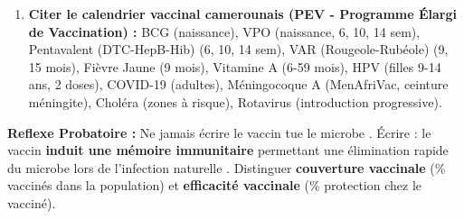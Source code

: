 \documentclass[11pt]{article}
\begin{document}
\begin{methode}
\begin{enumerate}
        \begin{itemize}
            \item \textbf{Seuil de couverture vaccinale ($S_c$) :} $S_c = 1 - \frac{1}{R_0}$ où $R_0$ = nombre de reproduction de base (contagiosité).
            \item Si couverture $> S_c$ : La chaîne de transmission est rompue. Le pathogène ne trouve plus assez d'hôtes sensibles.
            \item \textbf{Protection des non-vaccinables :} Nourrissons trop jeunes, immunodéprimés (VIH, chimiothérapie), allergiques graves, femmes enceintes (pour vaccins vivants atténués).
            \item \textbf{Éradication / Élimination :} Ex: Variole (éradiquée 1980), Polio (éliminée Afrique 2020, endémique seulement Pakistan/Afghanistan), Rougeole (objectif élimination).
        \end{itemize}
        \item \textbf{Citer le calendrier vaccinal camerounais (PEV - Programme Élargi de Vaccination) :} BCG (naissance), VPO (naissance, 6, 10, 14 sem), Pentavalent (DTC-HepB-Hib) (6, 10, 14 sem), VAR (Rougeole-Rubéole) (9, 15 mois), Fièvre Jaune (9 mois), Vitamine A (6-59 mois), HPV (filles 9-14 ans, 2 doses), COVID-19 (adultes), Méningocoque A (MenAfriVac, ceinture méningite), Choléra (zones à risque), Rotavirus (introduction progressive).
    \end{enumerate}
    \textbf{Reflexe Probatoire :} Ne jamais écrire \og le vaccin tue le microbe \fg. Écrire : \og le vaccin \textbf{induit une mémoire immunitaire} permettant une élimination rapide du microbe lors de l'infection naturelle \fg. Distinguer \textbf{couverture vaccinale} (\% vaccinés dans la population) et \textbf{efficacité vaccinale} (\% protection chez le vacciné).
\end{methode}
\end{document}
